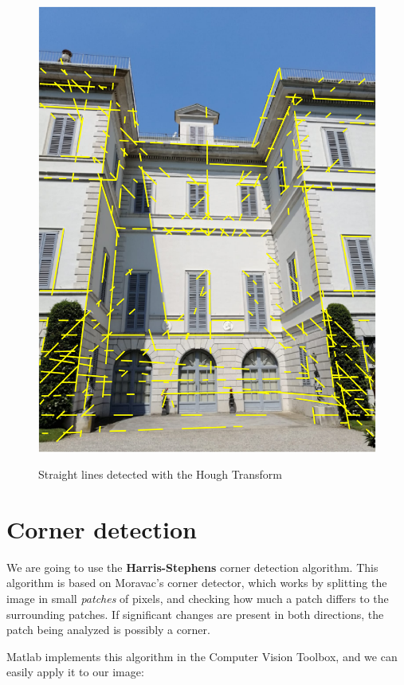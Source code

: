 \documentclass{Configuration_Files/PoliMi3i_thesis}
\begin{document}
\begin{figure}[H]
{        \includegraphics[scale=0.4]{output/F1_hough_n40_fg8_ml10.PNG}
    }
    \caption[Straight lines detected with the Hough Transform]{Straight lines detected with the Hough Transform}
    \label{fig:f1_hough_lines}
\end{figure}

\section{Corner detection}

We are going to use the \textbf{Harris-Stephens} corner detection algorithm. This algorithm is based on Moravac's corner detector, which works by splitting the image in small \emph{patches} of pixels, and checking how much a patch differs to the surrounding patches. If significant changes are present in both directions, the patch being analyzed is possibly a corner.

Matlab implements this algorithm in the Computer Vision Toolbox, and we can easily apply it to our image:
\end{document}
